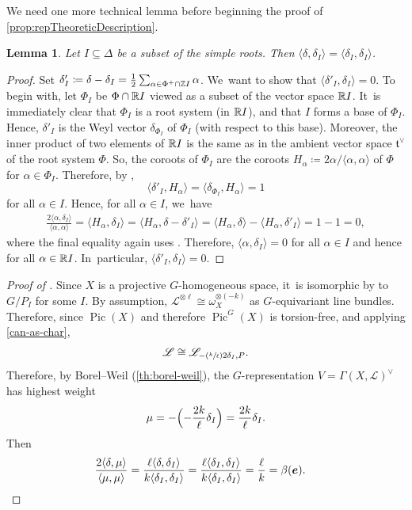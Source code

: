 \documentclass[11pt]{article}
\newcommand{\Psfrac}[2]{(\sfrac{#1}{#2})}
\newcommand{\bme}{{\boldsymbol{e}}}
\newtheorem{lem}[thm]{Lemma}
\DeclareMathOperator{\Pic}{Pic}
\begin{document}
We need one more technical lemma before beginning the proof of \cref{prop:repTheoreticDescription}.

\begin{lem}
Let $I\subseteq \Delta$ be a subset of the simple roots. Then $\langle\delta,\delta_I\rangle = \langle\delta_I, \delta_I\rangle$.
\end{lem}

\begin{proof}
Set $\delta_I' \coloneqq \delta - \delta_I = \frac{1}{2}\sum_{\alpha\in \Phi^+\cap {\mathbb Z} I} \alpha$. We~want to show that $\langle\delta'_I, \delta_I\rangle=0$. To begin with, let $\Phi_I$ be $\Phi\cap {\mathbb R} I$ viewed as a subset of the vector space ${\mathbb R} I$. It~is immediately clear that $\Phi_I$ is a root system (in ${\mathbb R} I$), and that $I$ forms a base of $\Phi_I$. Hence, $\delta'_I$ is the Weyl vector $\delta_{\Phi_I}$ of $\Phi_I$ (with respect to this base). Moreover, the inner product of two elements of ${\mathbb R} I$ is the same as in the ambient vector space $\mathfrak{t}^\vee$ of the root system $\Phi$. So, the coroots of $\Phi_I$ are the coroots $H_\alpha\coloneqq 2\alpha/\langle\alpha,\alpha\rangle$ of $\Phi$ for $\alpha\in \Phi_I$. Therefore, by \cite[Prop.\,8.38]{Hal15},
\[
\langle\delta'_I, H_\alpha\rangle = \langle\delta_{\Phi_I}, H_\alpha\rangle = 1
\]
for all $\alpha\in I$. Hence, for all $\alpha\in I$, we~have
\begin{align*}
\frac{2\langle \alpha, \delta_I\rangle}{\langle\alpha,\alpha\rangle}
= \langle H_\alpha, \delta_I\rangle
= \langle H_\alpha, \delta - \delta'_I\rangle
= \langle H_\alpha, \delta\rangle - \langle H_\alpha, \delta'_I\rangle
= 1-1 = 0,
\end{align*}
where the final equality again uses \cite[Prop.\,8.38]{Hal15}. Therefore, $\langle\alpha, \delta_I\rangle=0$ for all $\alpha\in I$ and hence for all $\alpha\in {\mathbb R} I$. In~particular, $\langle \delta'_I, \delta_I\rangle=0$.
\end{proof}

\begin{proof}[Proof of ]
Since $X$ is a projective $G$-homogeneous space, it~is isomorphic by  to $G/P_I$ for some $I$. By assumption, $\mathscr{L}^{\otimes \ell}\cong \omega_X^{\otimes (-k)}$ as $G$-equivariant line bundles. Therefore, since $\Pic(X)$ and therefore $\Pic^G(X)$ is torsion-free, and applying \cref{can-as-char},
\begin{equation*}
\mathscr{L} \cong \mathscr{L}_{-\Psfrac{k}{\ell}2\delta_I, P}.
\end{equation*}
Therefore, by Borel--Weil (\cref{th:borel-weil}), the $G$-representation $V=\Gamma(X, \mathscr{L})^\vee$ has highest weight
\[
\mu=-\Bigl(-\frac{2k}{\ell}\delta_I\Bigr)=\frac{2k}{\ell}\delta_I.
\]
Then
\begin{align*}
\frac{2\langle\delta, \mu\rangle}{\langle\mu,\mu\rangle}
&= \frac{\ell\langle \delta, \delta_I\rangle}{k\langle\delta_I, \delta_I\rangle}
= \frac{\ell\langle \delta_I, \delta_I\rangle}{k\langle\delta_I, \delta_I\rangle}
= \frac{\ell}{k}
= \beta(\bme). \qedhere
\end{align*}
\end{proof}
\end{document}

